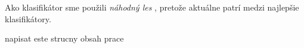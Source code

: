 Ako klasifikátor sme použili \emph{náhodný les} \cite{randomForestPaper}, pretože aktuálne patrí medzi najlepšie klasifikátory.




\todo napisat este strucny obsah prace

